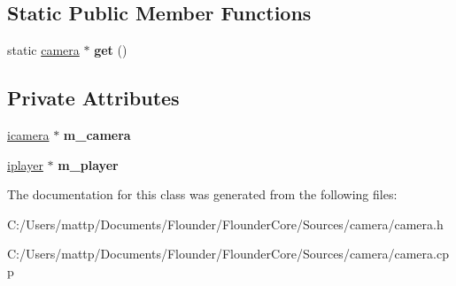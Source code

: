 \subsection*{Static Public Member Functions}
\begin{DoxyCompactItemize}
\item 
\mbox{\label{classflounder_1_1camera_a3ea117d355e4925fa5238bae5e6e46b1}} 
static \hyperlink{classflounder_1_1camera}{camera} $\ast$ {\bfseries get} ()
\end{DoxyCompactItemize}
\subsection*{Private Attributes}
\begin{DoxyCompactItemize}
\item 
\mbox{\label{classflounder_1_1camera_a0fdfccdc761a7c057c431e2e1b1e9456}} 
\hyperlink{classflounder_1_1icamera}{icamera} $\ast$ {\bfseries m\+\_\+camera}
\item 
\mbox{\label{classflounder_1_1camera_a8dc046728d790d77234a25dca96ac649}} 
\hyperlink{classflounder_1_1iplayer}{iplayer} $\ast$ {\bfseries m\+\_\+player}
\end{DoxyCompactItemize}


The documentation for this class was generated from the following files\+:\begin{DoxyCompactItemize}
\item 
C\+:/\+Users/mattp/\+Documents/\+Flounder/\+Flounder\+Core/\+Sources/camera/camera.\+h\item 
C\+:/\+Users/mattp/\+Documents/\+Flounder/\+Flounder\+Core/\+Sources/camera/camera.\+cpp\end{DoxyCompactItemize}
